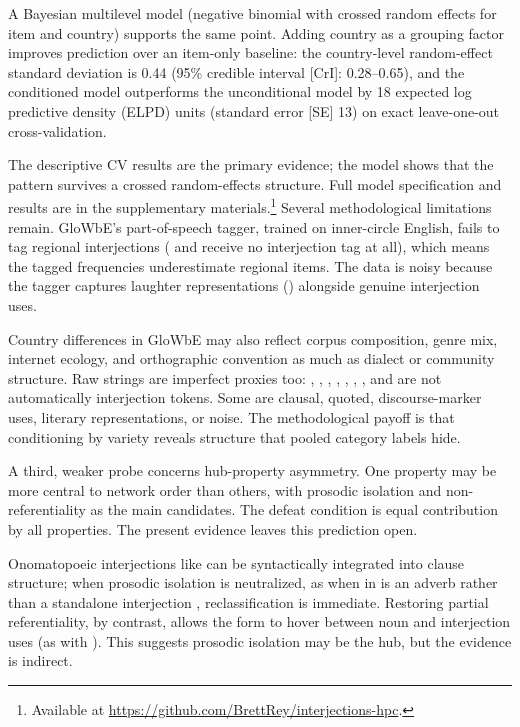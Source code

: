 \documentclass[12pt]{article}
\newif\ifblind
\begin{document}
A Bayesian multilevel model (negative binomial with crossed random
effects for item and country) supports the same point. Adding country as
a grouping factor improves prediction over an item-only baseline: the
country-level random-effect standard deviation is 0.44 (95\% credible
interval [CrI]: 0.28--0.65), and the conditioned model outperforms the
unconditional model by 18 expected log predictive density (ELPD) units
(standard error [SE] 13) on exact leave-one-out cross-validation.

The descriptive CV results are the primary evidence; the model shows
that the pattern survives a crossed random-effects structure. Full model
specification and results are in the
supplementary materials.\footnote{\ifblind Available at
  [link removed for blind review].\else Available at
  \url{https://github.com/BrettRey/interjections-hpc}.\fi}
Several methodological limitations remain. GloWbE's
part-of-speech tagger, trained on inner-circle English, fails to tag
regional interjections ( and  receive no
interjection tag at all), which means the tagged frequencies
underestimate regional items. The  data is noisy
because the tagger captures laughter representations
() alongside genuine interjection uses.

Country differences in GloWbE may also reflect corpus composition,
genre mix, internet ecology, and orthographic convention as much as
dialect or community structure. Raw strings are imperfect proxies too:
, , , ,
, , , and  are
not automatically interjection tokens. Some are clausal, quoted,
discourse-marker uses, literary representations, or noise. The
methodological payoff is that conditioning by variety reveals structure
that pooled category labels hide.

A third, weaker probe concerns hub-property asymmetry. One property may
be more central to network order than others, with prosodic isolation
and non-referentiality as the main candidates. The defeat condition is
equal contribution by all properties. The present evidence leaves this
prediction open.

Onomatopoeic interjections like  can be
syntactically integrated into clause structure; when prosodic isolation
is neutralized, as when  in 
is an adverb rather than a standalone interjection
\citep[152]{meinard2015}, reclassification is immediate. Restoring
partial referentiality, by contrast, allows the form to hover between
noun and interjection uses (as with ). This suggests
prosodic isolation may be the hub, but the evidence is indirect.
\end{document}
